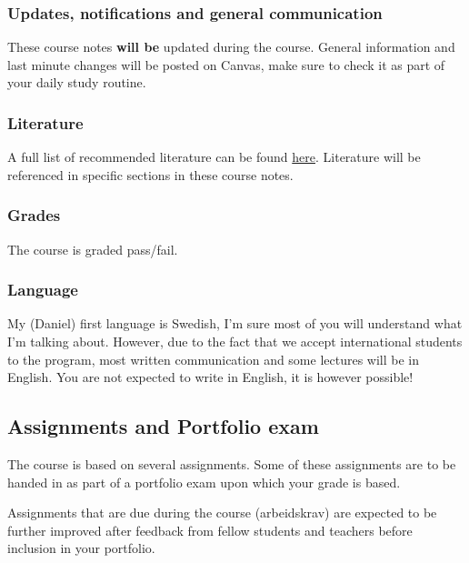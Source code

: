\documentclass[
]{article}
\begin{document}
\hypertarget{updates-notifications-and-general-communication}{%
\subsubsection{Updates, notifications and general communication}\label{updates-notifications-and-general-communication}}

These course notes \textbf{will be} updated during the course. General information and last minute changes will be posted on Canvas, make sure to check it as part of your daily study routine.

\hypertarget{literature}{%
\subsubsection{Literature}\label{literature}}

A full list of recommended literature can be found \href{https://www.inn.no/pensum}{here}. Literature will be referenced in specific sections in these course notes.

\hypertarget{grades}{%
\subsubsection{Grades}\label{grades}}

The course is graded pass/fail.

\hypertarget{language}{%
\subsubsection{Language}\label{language}}

My (Daniel) first language is Swedish, I'm sure most of you will understand what I'm talking about. However, due to the fact that we accept international students to the program, most written communication and some lectures will be in English. You are not expected to write in English, it is however possible!

\hypertarget{assignments-and-portfolio-exam}{%
\subsection{Assignments and Portfolio exam}\label{assignments-and-portfolio-exam}}

The course is based on several assignments. Some of these assignments are to be handed in as part of a portfolio exam upon which your grade is based.

Assignments that are due during the course (arbeidskrav) are expected to be further improved after feedback from fellow students and teachers before inclusion in your portfolio.
\end{document}
